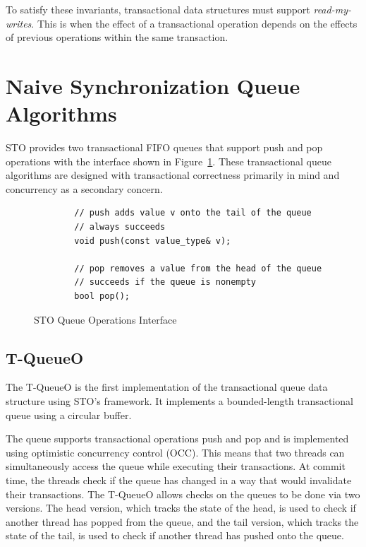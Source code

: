 \noindent
To satisfy these invariants, transactional data structures must support \emph{read-my-writes}. This is when the effect of a transactional operation depends on the effects of previous operations within the same transaction.

\section{Naive Synchronization Queue Algorithms}

STO provides two transactional FIFO queues that support push and pop operations with the interface shown in Figure~\ref{fig:q_interface}. These transactional queue algorithms are designed with transactional correctness primarily in mind and concurrency as a secondary concern. 

\begin{figure}[t]
    \centering
    \begin{lstlisting}
        // push adds value v onto the tail of the queue
        // always succeeds
        void push(const value_type& v); 
       
        // pop removes a value from the head of the queue
        // succeeds if the queue is nonempty 
        bool pop();                     
    \end{lstlisting}
    \caption{STO Queue Operations Interface}
    \label{fig:q_interface}
\end{figure}

\subsection{T-QueueO}
The T-QueueO is the first implementation of the transactional queue data structure using STO's framework. It implements a bounded-length transactional queue using a circular buffer.

The queue supports transactional operations push and pop and is implemented using optimistic concurrency control (OCC). This means that two threads can simultaneously access the queue while executing their transactions. At commit time, the threads check if the queue has changed in a way that would invalidate their transactions. The T-QueueO allows checks on the queues to be done via two versions. The head version, which tracks the state of the head, is used to check if another thread has popped from the queue, and the tail version, which tracks the state of the tail, is used to check if another thread has pushed onto the queue.

